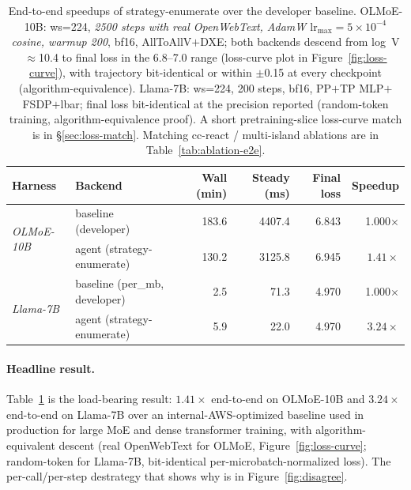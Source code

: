 \begin{table}[t]
\centering\small
\setlength{\tabcolsep}{5pt}
\begin{tabular}{llrrrr}
\toprule
\textbf{Harness} & \textbf{Backend} & \textbf{Wall (min)} & \textbf{Steady (ms)} & \textbf{Final loss} & \textbf{Speedup} \\
\midrule
\multirow{2}{*}{\textit{OLMoE-10B}}
  & baseline (developer)            & 183.6 & 4407.4 & 6.843 & 1.000$\times$ \\
  & agent (strategy-enumerate)      & 130.2 & 3125.8 & 6.945 & $\mathbf{1.41\times}$ \\
\midrule
\multirow{2}{*}{\textit{Llama-7B}}
  & baseline (per\_mb, developer)   & 2.5 & 71.3 & 4.970 & 1.000$\times$ \\
  & agent (strategy-enumerate)      & 5.9 & 22.0 & 4.970 & $\mathbf{3.24\times}$ \\
\bottomrule
\end{tabular}
\caption{End-to-end speedups of strategy-enumerate over the developer baseline. OLMoE-10B:
ws=224, \emph{2500 steps with real OpenWebText, AdamW $\text{lr}_{\max}{=}5\!\times\!10^{-4}$
cosine, warmup 200}, bf16, AllToAllV$+$DXE; both backends descend from log~V$\approx$10.4 to
final loss in the 6.8--7.0 range (loss-curve plot in Figure~\ref{fig:loss-curve}), with
trajectory bit-identical or within $\pm$0.15 at every checkpoint (algorithm-equivalence). Llama-7B:
ws=224, 200 steps, bf16, PP$+$TP MLP$+$FSDP$+$lbar; final loss bit-identical at the precision
reported (random-token training, algorithm-equivalence proof). A short pretraining-slice loss-curve
match is in §\ref{sec:loss-match}. Matching cc-react / multi-island ablations are in
Table~\ref{tab:ablation-e2e}.}
\label{tab:e2e}
\end{table}

\paragraph{Headline result.} Table~\ref{tab:e2e} is the
load-bearing result: $1.41\times$ end-to-end on OLMoE-10B and
$3.24\times$ end-to-end on Llama-7B over an
internal-AWS-optimized baseline used in production for large
MoE and dense transformer training, with algorithm-equivalent
descent (real OpenWebText for OLMoE,
Figure~\ref{fig:loss-curve}; random-token for Llama-7B,
bit-identical per-microbatch-normalized loss). The per-call/per-step
destrategy that shows why is in Figure~\ref{fig:disagree}.

